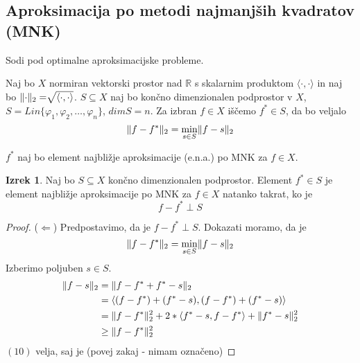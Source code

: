\documentclass[a4paper,12pt]{article}
\DeclarePairedDelimiter\norm{\lVert}{\rVert}
\newcommand{\innerproduct}[2]{\langle #1, #2 \rangle}
\theoremstyle{definition}
\newtheorem{theorem}[counter]{Izrek}
\theoremstyle{remark}
\newcommand{\R}{\mathbb{R}}
\begin{document}
\subsection{Aproksimacija po metodi najmanjših kvadratov (MNK)}
Sodi pod optimalne aproksimacijske probleme.

Naj bo $X$ normiran vektorski prostor nad $\R$ s skalarnim produktom $\innerproduct{\cdot}{\cdot}$ in naj bo $\norm{\cdot}_2 = \sqrt[]{\innerproduct{\cdot}{\cdot}}$.
$S \subseteq X$ naj bo končno dimenzionalen podprostor v $X$, $S = Lin\{\varphi_1, \varphi_2, \dots, \varphi_n\}$, $dimS = n$. Za izbran $f \in X$ iščemo $f^* \in S$, da bo veljalo
\begin{equation}
    \norm{f - f^*}_2 = \min_{s\in S} \norm{f - s}_2
\end{equation}

$f^*$ naj bo element najbližje aproksimacije (e.n.a.) po MNK za $f \in X$.

\begin{theorem}
    Naj bo $S \subseteq X$ končno dimenzionalen podprostor. Element $f^* \in S$ je element najbližje aproksimacije po MNK za $f \in X$ natanko takrat,
    ko je 
    \[f - f^* \perp S\]
\end{theorem}

\begin{proof}
    ($\Longleftarrow$)
    Predpostavimo, da je $f - f^* \perp S$. Dokazati moramo, da je 
    \[\norm{f - f^*}_2 = \min_{s \in S} \norm{f-s}_2\]
    Izberimo poljuben $s \in S$.
    \begin{align}
        \norm{f - s}_2 &=  \norm{f - f^* + f^* - s}_2\\
                       &= \innerproduct{(f - f^*) + (f^* - s)}{(f - f^*) + (f^* - s)}\\
                       &= \norm{f - f^*}_2^2 + 2 * \innerproduct{f^* - s}{f - f^*} + \norm{f^* - s}_2^2\\
                       &\geq \norm{f - f^*}_2^2
    \end{align}
    $(10)$ velja, saj je (povej zakaj - nimam označeno)
\end{proof}
\end{document}
